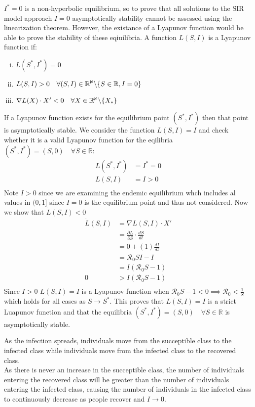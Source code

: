 $I^*=0$ is a non-hyperbolic equilibrium, so to prove that all solutions to the SIR model approach $I=0$ asymptotically stability cannot be assessed using the linearization theorem.
However, the existance of a Lyapunov function would be able to prove the stability of these eqiuilibria.
A function $L(S,I)$ is a Lyapunov function if:
\begin{enumerate}[(i)]
    \item $L(S^*,I^*) = 0$
    \item $L(S,I) > 0 \quad \forall (S,I) \in \mathbb{R^2} \char`\\ \{S \in \mathbb{R},I=0 \}$
    \item $\nabla L(X) \cdot X' < 0 \quad \forall X \in \mathbb{R^2}\char`\\ \{X_*\}$
\end{enumerate}
If a Lyapunov function exists for the equilibrium point $(S^*,I^*)$ then that point is asymptotically stable.
We consider the function $L(S,I) = I$ and check whether it is a valid Lyapunov function for the eqilibria $(S^*,I^*) = (S,0)\quad \forall S \in \mathbb{R}$:
\begin{align*}
    L(S^*,I^*) &= I^* = 0\\
    L(S,I)     &= I > 0\\
\end{align*}
Note $I >0$ since we are examining the endemic equilibrium whch includes al values in $(0,1]$ since $I=0$ is the equilibrium point and thus not considered.
Now we show that $\dot{L}(S,I) < 0$
\begin{align*}
    \dot{L}(S,I) &= \nabla L(S,I) \cdot X'\\
                 &= \frac{\partial L}{\partial S}\cdot \frac{dS}{dt}\\
                 & = 0 + (1)\frac{dI}{dt}\\
                 &={\mathcal R_0}SI -I\\
                 &=I({\mathcal R_0}S-1)\\
    0            &> I({\mathcal R_0}S-1) \label{eq:1}\\
\end{align*}
Since $I > 0$ $L(S,I) = I$ is a Lyapunov function when ${\mathcal R_0}S -1 < 0 \implies {\mathcal R_0} < \frac{1}{S}$ which holds for all cases as $S \to S^*$.
This proves that $L(S,I) = I$ is a strict Luapunov function and that the equilibria $(S^*,I^*) = (S,0)\quad \forall S \in \mathbb{R}$ is asymptotically stable.\par
As the infection spreads, individuals move from the succeptible class to the infected class while individuals move from the infected class to the recovered class.\\
As there is never an increase in the succeptible class, the number of individuals entering the recovered class will be greater than the number of individuals entering the infected class, causing the number of individuals in the infected class to continuously decrease as people recover and $I \to 0$.
